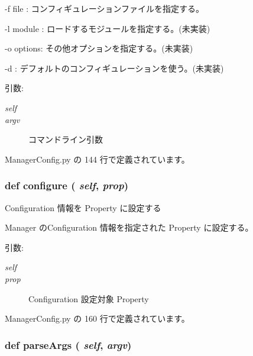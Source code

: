 -f file : コンフィギュレーションファイルを指定する。\par
 -l module : ロードするモジュールを指定する。(未実装)\par
 -o options: その他オプションを指定する。(未実装)\par
 -d : デフォルトのコンフィギュレーションを使う。(未実装)\par


\begin{Desc}
\item[引数:]
\begin{description}
\item[{\em self}]\item[{\em argv}]コマンドライン引数 \end{description}
\end{Desc}


 ManagerConfig.py の 144 行で定義されています。
\subsubsection{\setlength{\rightskip}{0pt plus 5cm}def configure ( {\em self},  {\em prop})}\label{classsource__py_1_1_manager_config_1_1_manager_config_926fbba338fc9e11437beccb27e11ba7}


Configuration 情報を Property に設定する 

Manager のConfiguration 情報を指定された Property に設定する。

\begin{Desc}
\item[引数:]
\begin{description}
\item[{\em self}]\item[{\em prop}]Configuration 設定対象 Property \end{description}
\end{Desc}


 ManagerConfig.py の 160 行で定義されています。
\subsubsection{\setlength{\rightskip}{0pt plus 5cm}def parseArgs ( {\em self},  {\em argv})}\label{classsource__py_1_1_manager_config_1_1_manager_config_b9890335edef22dc1c15dd4f899a9093}


